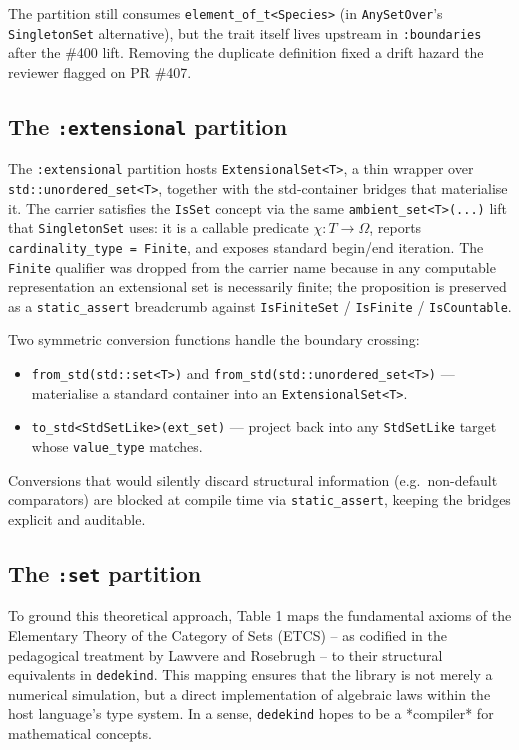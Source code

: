 \documentclass[11pt, a4paper]{report}
\begin{document}
The partition still consumes \texttt{element\_of\_t<Species>} (in \texttt{AnySetOver}'s \texttt{SingletonSet} alternative), but the trait itself lives upstream in \texttt{:boundaries} after the \#400 lift. Removing the duplicate definition fixed a drift hazard the reviewer flagged on PR \#407.

\subsection{The \texttt{:extensional} partition}
\label{sec:sets-extensional}

The \texttt{:extensional} partition hosts \texttt{ExtensionalSet<T>}, a thin wrapper over \texttt{std::unordered\_set<T>}, together with the std-container bridges that materialise it. The carrier satisfies the \texttt{IsSet} concept via the same \texttt{ambient\_set<T>(...)} lift that \texttt{SingletonSet} uses: it is a callable predicate $\chi : T \to \Omega$, reports \texttt{cardinality\_type = Finite}, and exposes standard begin/end iteration. The \texttt{Finite} qualifier was dropped from the carrier name because in any computable representation an extensional set is necessarily finite; the proposition is preserved as a \texttt{static\_assert} breadcrumb against \texttt{IsFiniteSet} / \texttt{IsFinite} / \texttt{IsCountable}.

Two symmetric conversion functions handle the boundary crossing:
\begin{itemize}
  \item \texttt{from\_std(std::set<T>)} and \texttt{from\_std(std::unordered\_set<T>)} --- materialise a standard container into an \texttt{ExtensionalSet<T>}.
  \item \texttt{to\_std<StdSetLike>(ext\_set)} --- project back into any \texttt{StdSetLike} target whose \texttt{value\_type} matches.
\end{itemize}
Conversions that would silently discard structural information (e.g.\ non-default comparators) are blocked at compile time via \texttt{static\_assert}, keeping the bridges explicit and auditable.

\subsection{The \texttt{:set} partition}
To ground this theoretical approach, Table 1 maps the fundamental axioms of the Elementary Theory of the Category of Sets (ETCS) -- as codified in the pedagogical treatment by Lawvere and Rosebrugh \cite{lawvere2003sets} -- to their structural equivalents in \texttt{dedekind}.
This mapping ensures that the library is not merely a numerical simulation, but a direct implementation of algebraic laws within the host language's type system.
In a sense, \texttt{dedekind} hopes to be a *compiler* for mathematical concepts.
\end{document}
